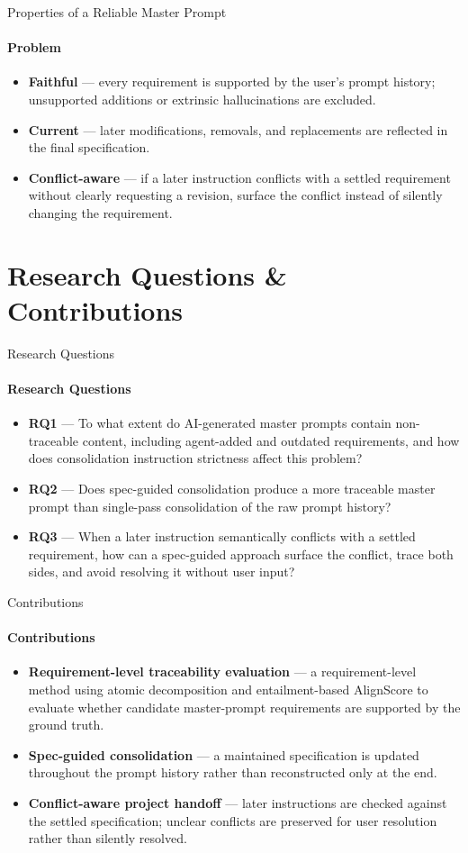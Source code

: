 \documentclass[aspectratio=169,11pt,c]{beamer}
\begin{document}
\begin{frame}{Properties of a Reliable Master Prompt}
  \framesubtitle{Problem}
  \begin{itemize}
    \item \textbf{Faithful} --- every requirement is supported by the user's prompt history; unsupported additions or extrinsic hallucinations are excluded.
    \item \textbf{Current} --- later modifications, removals, and replacements are reflected in the final specification.
    \item \textbf{Conflict-aware} --- if a later instruction conflicts with a settled requirement without clearly requesting a revision, surface the conflict instead of silently changing the requirement.
  \end{itemize}
\end{frame}

\section{Research Questions \& Contributions}

\begin{frame}{Research Questions}
  \framesubtitle{Research Questions}
  \begin{itemize}
    \item \textbf{RQ1} --- To what extent do AI-generated master prompts contain non-traceable content, including agent-added and outdated requirements, and how does consolidation instruction strictness affect this problem?
    \item \textbf{RQ2} --- Does spec-guided consolidation produce a more traceable master prompt than single-pass consolidation of the raw prompt history?
    \item \textbf{RQ3} --- When a later instruction semantically conflicts with a settled requirement, how can a spec-guided approach surface the conflict, trace both sides, and avoid resolving it without user input?
  \end{itemize}
\end{frame}

\begin{frame}{Contributions}
  \framesubtitle{Contributions}
  \begin{itemize}
    \item \textbf{Requirement-level traceability evaluation} --- a requirement-level method using atomic decomposition and entailment-based AlignScore to evaluate whether candidate master-prompt requirements are supported by the ground truth.
    \item \textbf{Spec-guided consolidation} --- a maintained specification is updated throughout the prompt history rather than reconstructed only at the end.
    \item \textbf{Conflict-aware project handoff} --- later instructions are checked against the settled specification; unclear conflicts are preserved for user resolution rather than silently resolved.
  \end{itemize}
\end{frame}
\end{document}
